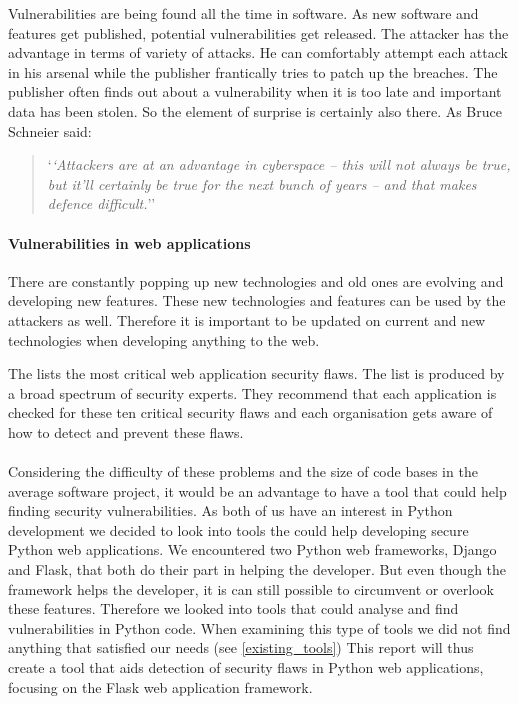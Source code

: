 Vulnerabilities are being found all the time in software.
As new software and features get published, potential vulnerabilities get released.
The attacker has the advantage in terms of variety of attacks.
He can comfortably attempt each attack in his arsenal while the publisher frantically tries to patch up the breaches.
The publisher often finds out about a vulnerability when it is too late and important data has been stolen.
So the element of surprise is certainly also there.
As Bruce Schneier said:
\begin{quote}
`\textit{`Attackers are at an advantage in cyberspace – this will not always be true, but it’ll certainly be true for the next bunch of years – and that makes defence difficult.}''\cite{schneier_interview}  
\end{quote}

\paragraph{Vulnerabilities in web applications}
There are constantly popping up new technologies and old ones are evolving and developing new features.
These new technologies and features can be used by the attackers as well.
Therefore it is important to be updated on current and new technologies when developing anything to the web.\cite{web_security_importance}

The \citet{OWASP10} lists the most critical web application security flaws.
The list is produced by a broad spectrum of security experts. 
They recommend that each application is checked for these ten critical security flaws and each organisation gets aware of how to detect and prevent these flaws.

\paragraph{}
Considering the difficulty of these problems and the size of code bases in the average software project, it would be an advantage to have a tool that could help finding security vulnerabilities.
As both of us have an interest in Python development we decided to look into tools the could help developing secure Python web applications.
We encountered two Python web frameworks, Django and Flask, that both do their part in helping the developer.
But even though the framework helps the developer, it is can still possible to circumvent or overlook these features.
Therefore we looked into tools that could analyse and find vulnerabilities in Python code.
When examining this type of tools we did not find anything that satisfied our needs (see \cref{existing_tools})
This report will thus create a tool that aids detection of security flaws in Python web applications, focusing on the Flask web application framework.
